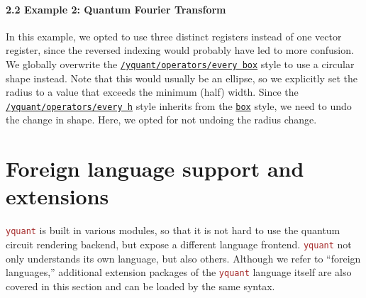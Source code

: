 \documentclass{scrartcl}
\makeatletter
\newenvironment{codeexample*}{%
   \VerbatimEnvironment%
   \let\FVB@VerbatimOut\minted@FVB@VerbatimOut
   \let\FVE@VerbatimOut\minted@FVE@VerbatimOut
   \minted@configlang{tex}%
   \minted@fvset
   \begin{VerbatimOut}[codes={\catcode`\^^I=12},firstline,lastline]{\minted@jobname.pyg}%
}{
   \end{VerbatimOut}%
   \minted@langlinenoson%
   \begin{adjustbox}{center}
       \minted@jobname.pyg %
   \end{adjustbox}\nopagebreak
   \minted@pygmentize{\minted@lang}%
   \minted@langlinenosoff%
   \par%
}
\def\pkg#1{\textcolor{brown}{\texttt{#1}}}
\def\gate#1{\hyperref[gate:#1]{\texttt{#1}}}
\def\style#1{\hyperref[style:#1]{\texttt{#1}}}
\def\Yquant{\pkg{yquant}}
\newcommand*{\the@orig@section}{}
\let\the@orig@section=\section
\renewcommand*{\section}{%
   \clearpage%
   \the@orig@section%
}
\makeatother
\begin{document}
            \paragraph{2.2 Example 2: Quantum Fourier Transform}
               \begin{example}
                  \begin{codeexample*}
                  \end{codeexample*}
                  In this example, we opted to use three distinct registers instead of one vector register, since the reversed indexing would probably have led to more confusion.
                  We globally overwrite the \style{/yquant/operators/every box} style to use a circular shape instead.
                  Note that this would usually be an ellipse, so we explicitly set the radius to a value that exceeds the minimum (half) width.
                  Since the \style{/yquant/operators/every h} style inherits from the \gate{box} style, we need to undo the change in shape.
                  Here, we opted for not undoing the radius change.
               \end{example}
         \endgroup

   \section{Foreign language support and extensions}\label{sec:foreign}
      \Yquant{} is built in various modules, so that it is not hard to use the quantum circuit rendering backend, but expose a different language frontend.
      \Yquant{} not only understands its own language, but also others.
      Although we refer to ``foreign languages,'' additional extension packages of the \Yquant{} language itself are also covered in this section and can be loaded by the same syntax.
\end{document}
